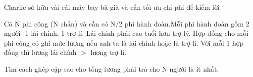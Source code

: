 Charlie sở hữu vài cái máy bay bà già và cần tối ưu chi phi để kiếm lời  

   Có N phi công (N chẵn) và cần có N/2 phi hành đoàn.Mỗi phi hành đoàn gồm 2 người- 1 lái chính, 1 trợ lí. Lái chính phải cao tuổi hơn trợ lý. Hợp đồng cho mỗi phi công có ghi mức lương nếu anh ta là lái chính hoặc là trợ lí.  Với mỗi 1 hợp đồng thì lương lái chính $>$ lương trợ lí.  

   Tìm cách ghép cặp sao cho tổng lương phải trả cho N người là ít nhất.